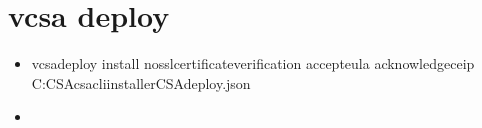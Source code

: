 \documentclass[a4paper,10pt,english]{sphinxmanual}
\begin{document}
\section{vcsa deploy}
\label{\detokenize{vmware/vcsa_deploy:vcsa-deploy}}\label{\detokenize{vmware/vcsa_deploy::doc}}\begin{itemize}
\item {} 

\begin{sphinxVerbatim}[commandchars=\\\{\}]
vcsa\PYGZhy{}deploy install \PYGZhy{}\PYGZhy{}no\PYGZhy{}ssl\PYGZhy{}certificate\PYGZhy{}verification \PYGZhy{}\PYGZhy{}accept\PYGZhy{}eula \PYGZhy{}\PYGZhy{}acknowledge\PYGZhy{}ceip C:CSAcsa\PYGZhy{}cli\PYGZhy{}installerCSA\PYGZus{}deploy.json
\end{sphinxVerbatim}

\item {} 


\end{itemize}
\end{document}
